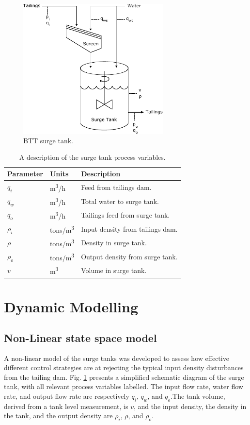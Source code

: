 \documentclass[preprint,authoryear,12pt]{elsarticle}
\begin{document}
\begin{figure}[t!]
	\centering
	\includegraphics[width=3in]{SurgeTankDrawingNew.pdf}
	\caption{BTT surge tank.}
	\label{fig:BTTSurgeTank}
\end{figure}

\begin{table}[bp]
	\centering
	\caption{A description of the surge tank process variables.}
	\label{Table:ProcessVariables}
	\begin{tabular}{lll}
		\hline 
		Parameter 	&  Units & Description \tabularnewline
		\hline
		$q_{i}$ 	& m\textsuperscript{3}/h 	& 	Feed from tailings dam.\tabularnewline
		$q_{w}$ 	& m\textsuperscript{3}/h 	& 	Total water to surge tank.\tabularnewline
		$q_{o}$ 	& m\textsuperscript{3}/h 	& 	Tailings feed from surge tank.\tabularnewline
		$\rho_i$	& tons/m\textsuperscript{3}	&	Input density from tailings dam.\tabularnewline
		$\rho$		& tons/m\textsuperscript{3}	&	Density in surge tank.\tabularnewline
		$\rho_o$	& tons/m\textsuperscript{3}	&	Output density from surge tank.\tabularnewline
		$v$			& m\textsuperscript{3}		&	Volume in surge tank.\tabularnewline
		\hline
	\end{tabular}
\end{table}


\section{Dynamic Modelling}\label{Section:DynamicModelling}
\subsection{Non-Linear state space model}
A non-linear model of the surge tanks was developed to assess how effective different control strategies are at rejecting the typical input density disturbances from the tailing dam. Fig. \ref{fig:BTTSurgeTank} presents a simplified schematic diagram of the surge tank, with all relevant process variables labelled. The input flow rate, water flow rate, and output flow rate are respectively $q_i$, $q_w$, and $q_o$.The tank volume, derived from a tank level measurement, is $v$, and the input density, the density in the tank, and the output density are $\rho_i$, $\rho$, and $\rho_o$.
\end{document}

